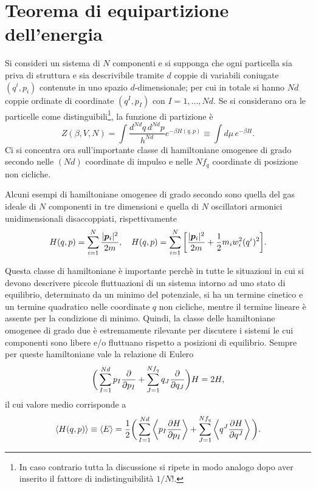 \section{Teorema di equipartizione dell'energia}
Si consideri un sistema di $N$ componenti e si supponga che ogni particella sia priva di struttura e sia descrivibile tramite $d$ coppie di variabili coniugate $(q^i,p_i)$ contenute in uno spazio $d$-dimensionale; per cui in totale si hanno $Nd$ coppie ordinate di coordinate $(q^I,p_I)$ con $I = 1,\dots,Nd$. Se si considerano ora le particelle come distinguibili\footnote{In caso contrario tutta la discussione si ripete in modo analogo dopo aver inserito il fattore di indistinguibilità $1/N!$.}, la funzione di partizione è
\begin{equation}
    Z(\beta,V,N) = \int\frac{d^{Nd}q\,d^{Nd}p}{h^{Nd}}e^{-\beta H(q,p)} \equiv \int d\mu\,e^{-\beta H}.
\end{equation}
Ci si concentra ora sull'importante classe di hamiltoniane omogenee di grado secondo nelle $(Nd)$ coordinate di impulso e nelle $Nf_q$ coordinate di posizione non cicliche.
\begin{ex}
    Alcuni esempi di hamiltoniane omogenee di grado secondo sono quella del gas ideale di $N$ componenti in tre dimensioni e quella di $N$ oscillatori armonici unidimensionali disaccoppiati, rispettivamente
    \begin{equation}
        H(q,p) = \sum_{i=1}^N\frac{|\bm{p}_i|^2}{2m},\quad H(q,p) = \sum_{i=1}^N\bigg[\frac{|\bm{p}_{i}|^2}{2m} + \frac{1}{2}m_i w_i^2 (q^i)^2\bigg].
    \end{equation}
\end{ex}
Questa classe di hamiltoniane è importante perchè in tutte le situazioni in cui si devono descrivere piccole fluttuazioni di un sistema intorno ad uno stato di equilibrio, determinato da un minimo del potenziale, si ha un termine cinetico e un termine quadratico nelle coordinate $q$ non cicliche, mentre il termine lineare è assente per la condizione di minimo. Quindi, la classe delle hamiltoniane omogenee di grado due è estremamente rilevante per discutere i sistemi le cui componenti sono libere e/o fluttuano rispetto a posizioni di equilibrio. Sempre per queste hamiltoniane vale la relazione di Eulero
\begin{equation}
\label{eq: relazione di Eulero}
    \bigg(\sum_{I=1}^{Nd}p_I\frac{\partial}{\partial p_I} + \sum_{J=1}^{Nf_q}q_J\frac{\partial}{\partial q_J}\bigg)H = 2H,
\end{equation}
il cui valore medio corrisponde a 
\begin{equation}
\label{eq: valore medio relazione di Eulero}
    \langle H(q,p) \rangle \equiv \langle E \rangle = \frac{1}{2}\bigg(\sum_{I=1}^{Nd}\left\langle p_I\frac{\partial H}{\partial p_I} \right\rangle + \sum_{J=1}^{Nf_q}\left\langle q^J\frac{\partial H}{\partial q^J} \right\rangle\bigg).
\end{equation}
